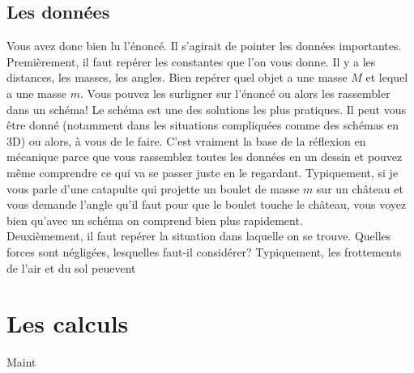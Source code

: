 \documentclass{article}
\begin{document}
\subsection{Les données}
Vous avez donc bien lu l'énoncé. Il s'agirait de pointer les données importantes. Premièrement, il faut repérer les constantes que l'on vous donne. Il y a les distances, les masses, les angles. Bien repérer quel objet a une masse $M$ et lequel a une masse $m$. Vous pouvez les surligner sur l'énoncé ou alors les rassembler dans un schéma! Le schéma est une des solutions les plus pratiques. Il peut vous être donné (notamment dans les situations compliquées comme des schémas en 3D) ou alors, à vous de le faire. C'est vraiment la base de la réflexion en mécanique parce que vous rassemblez toutes les données en un dessin et pouvez même comprendre ce qui va se passer juste en le regardant. Typiquement, si je vous parle d'une catapulte qui projette un boulet de masse $m$ sur un château et vous demande l'angle qu'il faut pour que le boulet touche le château, vous voyez bien qu'avec un schéma on comprend bien plus rapidement. \\
Deuxièmement, il faut repérer la situation dans laquelle on se trouve. Quelles forces sont négligées, lesquelles faut-il considérer? Typiquement, les frottements de l'air et du sol peuevent 

\section{Les calculs}
Maint
\end{document}
